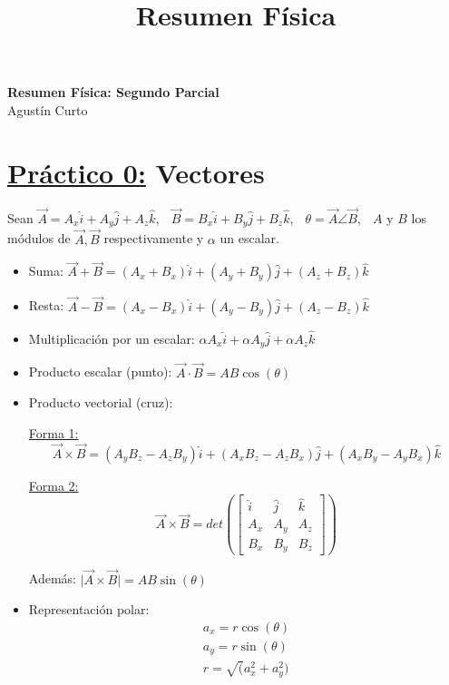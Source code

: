 \documentclass[12pt,a4paper]{article}
\title{Resumen Física}
\providecommand{\abs}[1]{\lvert#1\rvert}
\newcommand{\PN}{\par\noindent}
\begin{document}
	\begin{center}
		\Huge \textbf{Resumen Física: Segundo Parcial} \\
		\large Agustín Curto
	\end{center}

	\section*{\underline{Práctico 0:} Vectores}
		\PN Sean $\vec{A} = A_{x} \hat{i} + A_{y} \hat{j} + A_{z} \hat{k}$, $\;$ $\vec{B} = B_{x} \hat{i} + B_{y} \hat{j} +
			B_{z} \hat{k}$, $\;$ $\theta = \vec{A} \angle \vec{B}$, $\;$ $A$ y $B$ los módulos de $\vec{A}, \vec{B}$
			respectivamente y $\alpha$ un escalar.
		\begin{multicols}{2}
			\begin{itemize}
				\item Suma: $\vec{A} + \vec{B} = (A_{x} + B_{x}) \hat{i} + (A_{y} + B_{y}) \hat{j} + (A_{z} + B_{z}) \hat{k}$
				\item Resta: $\vec{A} - \vec{B} = (A_{x} - B_{x}) \hat{i} + (A_{y} - B_{y}) \hat{j} + (A_{z} - B_{z}) \hat{k}$
				\item Multiplicación por un escalar: $\alpha A_{x} \hat{i} + \alpha A_{y} \hat{j} + \alpha A_{z} \hat{k}$
				\item Producto escalar (punto): $\vec{A} \cdot \vec{B} = AB \cos(\theta)$
				\item Producto vectorial (cruz):
					\PN \underline{Forma 1:}
					\[
						\vec{A} \times \vec{B} = (A_{y}B_{z} - A_{z}B_{y}) \hat{i} + (A_{x}B_{z} - A_{z}B_{x}) \hat{j} +
						(A_{x}B_{y} - A_{y}B_{x}) \hat{k}
					\]

					\PN \underline{Forma 2:}
						\[
							\vec{A} \times \vec{B} = det
								\left(
									\begin{bmatrix}
										\hat{i} & \hat{j} & \hat{k} \\
										A_{x} & A_{y} & A_{z} \\
										B_{x} & B_{y} & B_{z}
									\end{bmatrix}
								\right)
						\]
					\PN Además: $\abs{\vec{A} \times \vec{B}} = AB \sin(\theta)$
				\item Representación polar:
					\begin{eqnarray*}
						a_{x} = r \cos(\theta) \\
						a_{y} = r \sin(\theta) \\
						r = \sqrt(a_{x}^{2} + a_{y}^{2})
					\end{eqnarray*}
			\end{itemize}
		\end{multicols}
\end{document}
